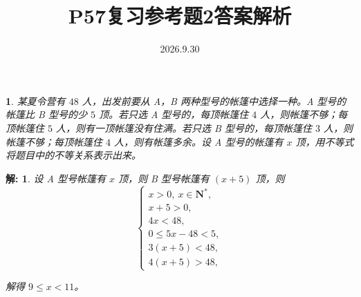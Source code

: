 \documentclass[aspectratio=169,13pt,fleqn,t] {beamer}
\title[P57复习参考题2答案解析]{P57复习参考题2答案解析}
\author[好好学习，努力向上]{}
\institute{}
\date{2026.9.30}
\newtheorem*{solve}{解:}
\newtheorem{Prob}{}
\begin{document}
\begin{frame}{}
	\titlepage
\end{frame}


\begin{frame}
	\vspace{-1em}
	\begin{Prob}
		某夏令营有 $48$ 人，出发前要从 A，B 两种型号的帐篷中选择一种。A 型号的帐篷比 B 型号的少 $5$ 顶。若只选 A 型号的，每顶帐篷住 $4$ 人，则帐篷不够；每顶帐篷住 $5$ 人，则有一顶帐篷没有住满。若只选 B 型号的，每顶帐篷住 $3$ 人，则帐篷不够；每顶帐篷住 $4$ 人，则有帐篷多余。设 A 型号的帐篷有 $x$ 顶，用不等式将题目中的不等关系表示出来。
	\end{Prob}
	\vspace{-1em}
	\begin{solve}
		\small
		设 A 型号帐篷有 $x$ 顶，则 B 型号帐篷有 $(x+5)$ 顶，则
		\vspace{-1em}
		\[
		\begin{cases}
			x>0,\ x\in \mathbf{N}^*,\\
			x+5>0,\\
			4x<48,\\
			0\leq 5x-48<5,\\
			3(x+5)<48,\\
			4(x+5)>48,
		\end{cases}
		\]
		
		\vspace{-1em}
		解得 $9\leq x<11$。
	\end{solve}
\end{frame}
\end{document}
